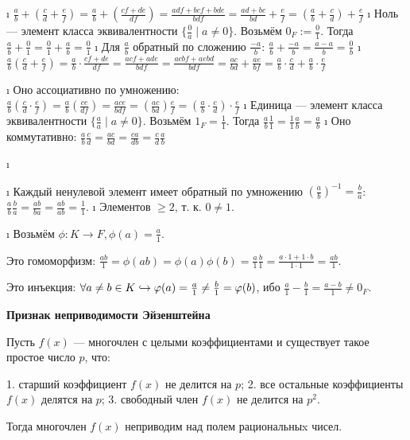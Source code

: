 \begin{solution}
\begin{enumerate}
\begin{itemize}
    \begin{itemize}
    \tightlist
    \i
      \(\frac{a}{b} + (\frac{c}{d} + \frac{e}{f}) = \frac{a}{b} + (\frac{cf+de}{df}) = \frac{adf+bcf+bde}{bdf} = \frac{ad+bc}{bd}+\frac{e}{f} = (\frac{a}{b} + \frac{c}{d}) + \frac{e}{f}\)
    \i
      Ноль --- элемент класса эквивалентности \(\{\frac{0}{a} \mid a \ne 0\}\). Возьмём \(0_F := \frac{0}{1}\). Тогда \(\frac{a}{b} + \frac{0}{1} = \frac{0}{1} + \frac{a}{b} = \frac{0}{1}\)
    \i
      Для \(\frac{a}{b}\) обратный по сложению \(\frac{-a}{b}\): \(\frac{a}{b}+\frac{-a}{b} = \frac{a-a}{b} = \frac{0}{b}\)
    \i
      \(\frac{a}{b} (\frac{c}{d} + \frac{e}{f}) = \frac{a}{b} \cdot \frac{cf+de}{df} = \frac{acf+ade}{bdf} = \frac{acbf+aebd}{bdf} = \frac{ac}{bd}+\frac{ae}{bf} = \frac{a}{b}\cdot \frac{c}{d}+\frac{a}{b} \cdot \frac{e}{f}\)
    \end{itemize}
  \i
    Оно ассоциативно по умножению: \(\frac{a}{b} (\frac{c}{d} \cdot \frac{e}{f}) = \frac{a}{b} (\frac{ce}{df} ) = \frac{ace}{bdf} = (\frac{ac}{bd}) \frac{e}{f} = (\frac{a}{b} \cdot \frac{c}{d}) \cdot \frac{e}{f}\)
  \i
    Единица --- элемент класса эквивалентности \(\{\frac{a}{a} \mid a \ne 0\}\). Возьмём \(1_F = \frac{1}{1}\). Тогда \(\frac{a}{b} \frac{1}{1} = \frac{1}{1} \frac{a}{b} = \frac{a}{b}\)
  \i
    Оно коммутативно: \(\frac{a}{b} \frac{c}{d} = \frac{ac}{bd} = \frac{ca}{db} = \frac{c}{d} \frac{a}{b}\)
  \end{itemize}
\i
  \begin{itemize}
  \tightlist
  \i
    Каждый ненулевой элемент имеет обратный по умножению \((\frac{a}{b})^{-1} = \frac{b}{a}\): \(\frac{a}{b} \frac{b}{a} = \frac{ab}{ba} = \frac{ab}{ab} = \frac{1}{1}\).
  \i
    Элементов \(\ge 2\), т. к. \(0 \ne 1\).
  \end{itemize}
\i
  Возьмём \(\phi: K \to F, \phi(a) = \frac{a}{1}\).

  Это гомоморфизм: \(\frac{ab}{1} = \phi(ab) = \phi(a)\phi(b) = \frac{a}{1}\frac{b}{1} = \frac{a\cdot 1+1 \cdot b}{1\cdot 1} = \frac{ab}{1}\).

  Это инъекция: \(\forall a \ne b \in K \hookrightarrow \varphi(a) = \frac{a}{1} \ne \frac{b}{1} = \varphi(b)\), ибо \(\frac{a}{1} - \frac{b}{1} = \frac{a-b}{1} \ne 0_F\).
\end{enumerate}

\end{solution}

\begin{problem}[24(6.1)]
\bf{Признак неприводимости Эйзенштейна}

Пусть $f(x)$ --- многочлен с целыми коэффициентами и существует такое простое число $p$, что:

1. старший коэффициент $f(x)$ не делится на $p$;
2. все остальные коэффициенты $f(x)$ делятся на $p$;
3. свободный член $f(x)$ не делится на $p^2$.

Тогда многочлен $f(x)$ неприводим над полем рациональныx чисел.
\end{problem}

